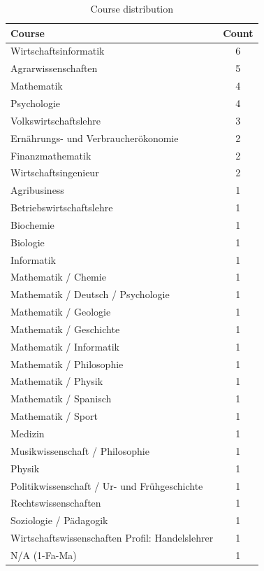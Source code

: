 \documentclass{sig-alternate-05-2015}
\begin{document}
\begin{table}[!h]
	\centering
	\caption{Course distribution}\label{tab:course}
	\begin{tabular}{@{}p{14cm}|c}
		\toprule
		\textbf{Course} & \textbf{Count} \\
		\midrule Wirtschaftsinformatik & 6 \\
		\midrule Agrarwissenschaften & 5 \\
		\midrule Mathematik & 4 \\
		\midrule Psychologie & 4 \\
		\midrule Volkswirtschaftslehre & 3 \\
		\midrule Ernährungs- und Verbraucherökonomie & 2 \\
		\midrule Finanzmathematik & 2 \\
		\midrule Wirtschaftsingenieur & 2 \\
		\midrule Agribusiness & 1 \\
		\midrule Betriebswirtschaftslehre & 1 \\
		\midrule Biochemie & 1 \\
		\midrule Biologie & 1 \\
		\midrule Informatik & 1 \\
		
		\midrule Mathematik / Chemie & 1 \\
		\midrule Mathematik / Deutsch / Psychologie & 1 \\
		\midrule Mathematik / Geologie & 1 \\
		\midrule Mathematik / Geschichte & 1 \\
		\midrule Mathematik / Informatik & 1 \\
		\midrule Mathematik / Philosophie & 1 \\
		\midrule Mathematik / Physik & 1 \\
		\midrule Mathematik / Spanisch & 1 \\
		\midrule Mathematik / Sport & 1 \\
		
		\midrule Medizin & 1 \\
		\midrule Musikwissenschaft / Philosophie & 1 \\
		\midrule Physik & 1 \\
		\midrule Politikwissenschaft / Ur- und Frühgeschichte & 1 \\
		\midrule Rechtswissenschaften & 1 \\
		\midrule Soziologie / Pädagogik & 1 \\
		\midrule Wirtschaftswissenschaften Profil: Handelslehrer & 1 \\
		\midrule N/A (1-Fa-Ma) & 1 \\
	\end{tabular}
\end{table}
\end{document}
